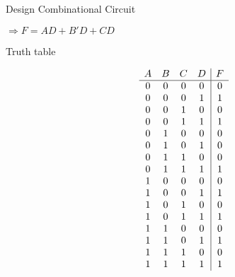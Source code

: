 \documentclass{vhdl-assignment}
\begin{document}
\begin{problem}{Design Combinational Circuit}
\begin{multicols*}{2}
        $\Rightarrow F=AD+B'D+CD$
    
        \vfill\null
        \columnbreak
    
        \begin{center}
            Truth table
        \end{center}
        \begin{displaymath}
            \begin{array}{c c c c|c}
                A & B & C & D & F \\
                \hline
                0 & 0 & 0 & 0 & 0 \\
                0 & 0 & 0 & 1 & 1 \\
                0 & 0 & 1 & 0 & 0 \\
                0 & 0 & 1 & 1 & 1 \\
                0 & 1 & 0 & 0 & 0 \\
                0 & 1 & 0 & 1 & 0 \\
                0 & 1 & 1 & 0 & 0 \\
                0 & 1 & 1 & 1 & 1 \\
                1 & 0 & 0 & 0 & 0 \\
                1 & 0 & 0 & 1 & 1 \\
                1 & 0 & 1 & 0 & 0 \\
                1 & 0 & 1 & 1 & 1 \\
                1 & 1 & 0 & 0 & 0 \\
                1 & 1 & 0 & 1 & 1 \\
                1 & 1 & 1 & 0 & 0 \\
                1 & 1 & 1 & 1 & 1 \\
            \end{array}
        \end{displaymath}
    \end{multicols*}
    
    \pagebreak
\end{problem}
\end{document}

